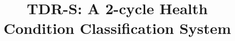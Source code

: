 \documentclass{review}
\begin{document}
\title{TDR-S: A 2-cycle Health Condition Classification System}

%


\maketitle


\end{document}
